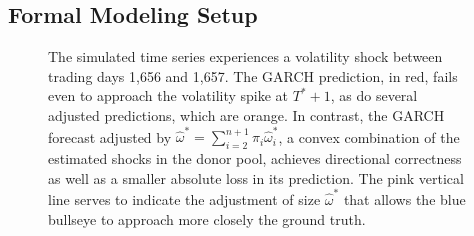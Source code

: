 \documentclass[11pt]{article}
\theoremstyle{definition}
\begin{document}
\subsection{Formal Modeling Setup}

  \begin{figure}[h!]
    \begin{center}
      \caption{The simulated time series experiences a volatility shock between trading days 1,656 and 1,657.  The GARCH prediction, in red, fails even to approach the volatility spike at $T^{*}+1$, as do several adjusted predictions, which are orange.  In contrast, the GARCH forecast adjusted by $\hat\omega^{*} = \sum^{n+1}_{i=2}\pi_{i}\hat\omega^{*}_{i} $, a convex combination of the estimated shocks in the donor pool, achieves directional correctness as well as a smaller absolute loss in its prediction.  The pink vertical line serves to indicate the adjustment of size $\hat\omega^{*}$ that allows the blue bullseye to approach more closely the ground truth.}    \label{fig:motivating_piece_convex_combination}
   
      \end{center}
    \end{figure}
\end{document}

